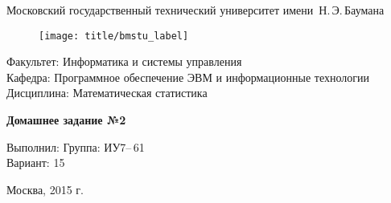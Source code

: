 
\thispagestyle{empty}

\begin{center}
    \Large
    Московский государственный технический университет имени~Н.\,Э.\,Баумана
\end{center}

\begin{figure}[h!]
    \begin{center}
        \texttt{[image: title/bmstu\_label]}
    \end{center}
\end{figure}

{\large
\noindent
Факультет: Информатика и системы управления\\[2mm]
\noindent
Кафедра: Программное обеспечение ЭВМ и информационные технологии\\[2mm]
\noindent
Дисциплина: Математическая статистика
\vspace{1.5cm}}

\begin{center}
    \Large
    \textbf{Домашнее задание №2} \\
\end{center}
\vfill

\hfill\begin{minipage}{0.35\textwidth}
    Выполнил:
    Группа: ИУ7--\,61\\
    Вариант: 15
\end{minipage}
\vfill

\begin{center}
    Москва, 2015 г.
\end{center}